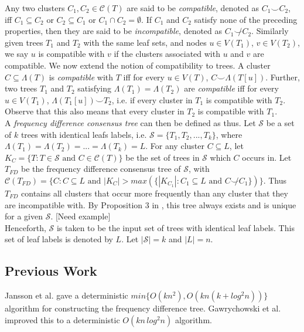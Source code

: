 \documentclass{article}
\newcommand{\compatible}{\smile}
\newcommand{\leafset}{\Lambda}
\begin{document}
    Any two clusters $C_1, C_2 \in \mathcal{C}(T)$ are said to be \textit{compatible}, denoted as $C_1 \compatible C_2$, iff $C_1 \subseteq C_2$ or $C_2 \subseteq C_1$ or $C_1 \cap C_2 = \emptyset$. If $C_1$ and $C_2$ satisfy none of the preceding properties, then they are said to be \textit{incompatible}, denoted as $C_1 \not\compatible C_2$. Similarly given trees $T_1$ and $T_2$ with the same leaf sets, and nodes $u \in V(T_1)$, $v \in V(T_2)$, we say $u$ is compatible with $v$ if the clusters associated with $u$ and $v$ are compatible. We now extend the notion of compatibility to trees. A cluster $C \subseteq \leafset(T)$ is \textit{compatible} with $T$ iff for every $u \in V(T)$, $C \compatible \leafset(T[u])$. Further, two trees $T_1$ and $T_2$ satisfying $\leafset(T_1) = \leafset(T_2)$ are \textit{compatible} iff for every $u \in V(T_1)$, $\leafset(T_1[u]) \compatible T_2$, i.e. if every cluster in $T_1$ is compatible with $T_2$. Observe that this also means that every cluster in $T_2$ is compatible with $T_1$.\\

    A \textit{frequency difference consensus tree} can then be defined as thus. Let $\mathcal{S}$ be a set of $k$ trees with identical leafs labels, i.e. $\mathcal{S} = \{T_1, T_2, ..., T_k\}$, where $\leafset(T_1) = \leafset(T_2) = ... = \leafset(T_k) = L$. For any cluster $C \subseteq L$, let $K_C = \{T : T \in \mathcal{S} \text{ and } C \in \mathcal{C}(T)\}$ be the set of trees in $\mathcal{S}$ which $C$ occurs in. Let $T_{FD}$ be the frequency difference consensus tree of $\mathcal{S}$, with $\mathcal{C}(T_{FD}) = \{C : C \subseteq L \text{ and } |K_C| > max(\{|K_{C_1}| : C_1 \subseteq L \text{ and } C \not\compatible C_1\})\}$. Thus $T_{FD}$ contains all clusters that occur more frequently than any cluster that they are incompatible with. By Proposition $3$ in \cite{steel2014axiomatic}, this tree always exists and is unique for a given $\mathcal{S}$. [Need example]\\

    Henceforth, $\mathcal{S}$ is taken to be the input set of trees with identical leaf labels. This set of leaf labels is denoted by $L$. Let $|\mathcal{S}| = k$ and $|L| = n$.

    \subsection{Previous Work}
    Jansson et al. \cite{jansson2018algorithms} gave a deterministic $min\{O(kn^2), O(kn(k + log^2 n))\}$ algorithm for constructing the frequency difference tree. Gawrychowski et al. \cite{gawrychowski2017faster} improved this to a deterministic $O(kn\,log^2n)$ algorithm.
\end{document}
